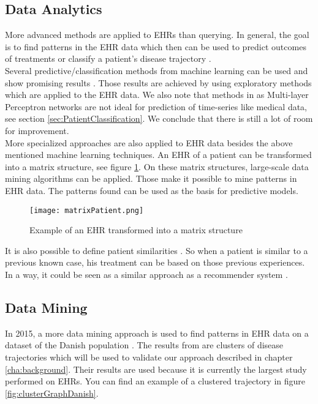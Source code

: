 \subsection{Data Analytics}

More advanced methods are applied to EHRs than querying. In general, the goal is to find patterns in the EHR data which then can be used to predict outcomes of treatments or classify a patient's disease trajectory \cite{EHRbigdata:slides}. \\

Several predictive/classification methods from machine learning can be used and show promising results \cite{EHRmining:article}. Those results are achieved by using exploratory methods which are applied to the EHR data. We also note that methods in \cite{EHRmining:article} as Multi-layer Perceptron networks are not ideal for prediction of time-series like medical data, see section \ref{sec:PatientClassification}. We conclude that there is still a lot of room for improvement. \\
 
More specialized approaches are also applied to EHR data \cite{EHRrecommender:article} besides the above mentioned machine learning techniques. 
An EHR of a patient can be transformed into a matrix structure, see figure \ref{fig:matrixPatient}. On these matrix structures, large-scale data mining algorithms can be applied. Those make it possible to mine patterns in EHR data. The patterns found can be used as the basis for predictive models.

\begin{figure}[!htb]
	\centering
	\texttt{[image: matrixPatient.png]}
	\caption{Example of an EHR transformed into a matrix structure \cite{EHRrecommender:article}}
	\label{fig:matrixPatient}
\end{figure}

It is also possible to define patient similarities \cite{EHRsimilarity:article}. So when a patient is similar to a previous known case, his treatment can be based on those previous experiences. In a way, it could be seen as a similar approach as a recommender system \cite{recommender:article}.


\subsection{Data Mining}
\label{sec:brunak}

In 2015, a more data mining approach is used to find patterns in EHR data on a dataset of the Danish population \cite{Brunak:article}. The results from \cite{Brunak:article} are clusters of disease trajectories which will be used to validate our approach described in chapter \ref{cha:background}. Their results are used because it is currently the largest study performed on EHRs. You can find an example of a clustered trajectory in figure \ref{fig:clusterGraphDanish}. \\

